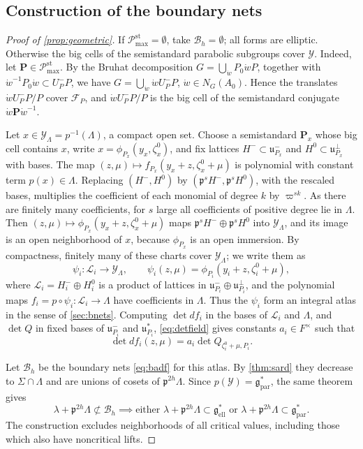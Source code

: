 \documentclass[11pt,reqno]{amsart}
\numberwithin{equation}{section}
\theoremstyle{plain}
\theoremstyle{definition}
\theoremstyle{remark}
\theoremstyle{plain}
\newcommand{\pp}{\mathfrak{p}}   %
\newcommand{\Lat}{\mathcal{L}}   %
\newcommand{\dLat}{\Lambda}      %
\newcommand{\bG}{\mathbf{G}}     %
\newcommand{\bP}{\mathbf{P}}     %
\newcommand{\g}{\mathfrak{g}}    %
\newcommand{\gd}{\mathfrak{g}^*} %
\newcommand{\uu}{\mathfrak{u}}   %
\newcommand{\Ell}[2][]{#2_{#1\mathrm{ell}}}   %
\newcommand{\Par}[2][]{#2_{#1\mathrm{par}}}
\newcommand{\Bad}{\mathcal{B}}   %
\newcommand{\bnets}{boundary nets}
\newcommand{\Pc}{\mathscr{P}^{\mathrm{st}}_{\mathrm{max}}}    %
\newcommand{\Fl}{\mathcal{F}}    %
\newcommand{\bFl}{\boldsymbol{\Fl}}  %
\newcommand{\lf}{\lambda}
\newcommand{\nf}{\zeta}
\newcommand{\Inc}{\mathcal{Y}}
\newcommand{\Crv}{\Sigma}
\newcommand{\iatlas}{integral atlas}
\begin{document}
\subsection{Construction of the \bnets{}}\label{sec:bad}
\begin{proof}[Proof of \cref{prop:geometric}]
If $\Pc=\emptyset$, take $\Bad_h=\emptyset$; all forms are elliptic.
Otherwise the big cells of the semistandard parabolic subgroups
cover $\Inc$. Indeed, let $\bP\in\Pc$. By the Bruhat decomposition
$G=\bigcup_{\dot w}P_0\dot wP$, together with
$\dot w^{-1}P_0\dot w\subset U_P^-P$, we have $G=\bigcup_{\dot w}\dot wU_P^-P$,
$\dot w\in N_G(A_0)$. Hence the translates $\dot wU_P^-P/P$ cover
$\Fl_P$, and $\dot wU_P^-P/P$ is the big cell of the semistandard
conjugate $\dot w\bP\dot w^{-1}$.

Let $x\in\Inc_\dLat=p^{-1}(\dLat)$, a compact open set. Choose a
semistandard $\bP_x$ whose big cell contains $x$, write
$x=\phi_{P_x}(y_x,\nf_x^0)$, and fix lattices $H^-\subset\uu_{P_x}^-$ and
$H^0\subset\uu_{P_x}^\perp$ with bases. The map
$(z,\mu)\mapsto f_{P_x}(y_x+z,\nf_x^0+\mu)$ is polynomial with constant term
$p(x)\in\dLat$. Replacing $(H^-,H^0)$ by $(\pp^sH^-,\pp^sH^0)$, with the
rescaled bases, multiplies the coefficient of each monomial of degree $k$
by $\varpi^{sk}$. As there are finitely many coefficients, for $s$ large
all coefficients of positive degree lie in $\dLat$. Then
$(z,\mu)\mapsto\phi_{P_x}(y_x+z,\nf_x^0+\mu)$ maps $\pp^sH^-\oplus\pp^sH^0$
into $\Inc_\dLat$, and its image is an open neighborhood of $x$, because
$\phi_{P_x}$ is an open immersion. By compactness, finitely many of these
charts cover $\Inc_\dLat$; we write them as
\[
\psi_i:\Lat_i\longrightarrow\Inc_\dLat,\qquad
\psi_i(z,\mu)=\phi_{P_i}(y_i+z,\nf_i^0+\mu),
\]
where $\Lat_i=H_i^-\oplus H_i^0$ is a product of lattices in
$\uu_{P_i}^-\oplus\uu_{P_i}^\perp$, and the polynomial maps
$f_i=p\circ\psi_i:\Lat_i\to\dLat$ have coefficients in $\dLat$.
Thus the $\psi_i$ form an \iatlas{} in the sense of \cref{sec:bnets}.
Computing $\det df_i$ in the bases of $\Lat_i$ and $\dLat$, and $\det Q$ in
fixed bases of $\uu_{P_i}^-$ and $\uu_{P_i}^*$, \eqref{eq:detfield} gives
constants $a_i\in F^\times$ such that
\begin{equation}\label{eq:atlasjacobian}
\det df_i(z,\mu)=a_i\det Q_{\nf_i^0+\mu,P_i}.
\end{equation}


Let $\Bad_h$ be the \bnets{} \eqref{eq:badf} for this atlas.
By \cref{thm:sard} they decrease to $\Crv\cap\dLat$ and are unions of
cosets of $\pp^{2h}\dLat$. Since $p(\Inc)=\Par{\gd}$, the same theorem gives
\begin{equation}\label{eq:dichotomy}
\lf+\pp^{2h}\dLat\not\subset\Bad_h\implies
\text{either }\lf+\pp^{2h}\dLat\subset\Ell{\gd}
\text{ or }\lf+\pp^{2h}\dLat\subset\Par{\gd}.
\end{equation}
The construction excludes neighborhoods of all critical values,
including those which also have noncritical lifts.


\end{proof}
\end{document}
